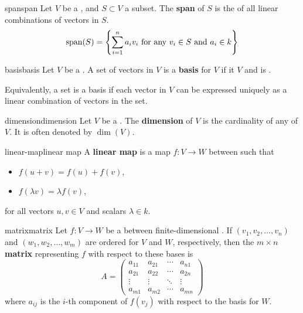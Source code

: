 \begin{topic}{span}{span}
    Let $V$ be a , and $S \subset V$ a subset. The \textbf{span} of $S$ is the  of all linear combinations of vectors in $S$.
    \[ \textup{span}(S) = \left\{ \sum_{i = 1}^{n} a_i v_i \textup{ for any } v_i \in S \textup{ and } a_i \in k \right\} \]
\end{topic}

\begin{topic}{basis}{basis}
    Let $V$ be a . A set of vectors in $V$ is a \textbf{basis} for $V$ if it  $V$ and is .
    
    Equivalently, a set is a basis if each vector in $V$ can be expressed uniquely as a linear combination of vectors in the set.
\end{topic}

\begin{topic}{dimension}{dimension}
    Let $V$ be a . The \textbf{dimension} of $V$ is the cardinality of any  of $V$. It is often denoted by $\dim(V)$.
\end{topic}

\begin{topic}{linear-map}{linear map}
    A \textbf{linear map} is a map $f \colon V \to W$ between  such that
    \begin{itemize}
        \item $f(u + v) = f(u) + f(v)$,
        \item $f(\lambda v) = \lambda f(v)$,
    \end{itemize}
    for all vectors $u, v \in V$ and scalars $\lambda \in k$.
\end{topic}

\begin{topic}{matrix}{matrix}
    Let $f \colon V \to W$ be a  between finite-dimensional . If $(v_1, v_2, \ldots, v_n)$ and $(w_1, w_2, \ldots, w_m)$ are ordered  for $V$ and $W$, respectively, then the $m \times n$ \textbf{matrix} representing $f$ with respect to these bases is
    \[ A = \begin{pmatrix} a_{11} & a_{21} & \cdots & a_{n1} \\ a_{21} & a_{22} & \cdots & a_{2n} \\ \vdots & \vdots & \ddots & \vdots \\ a_{m1} & a_{m2} & \cdots & a_{mn} \end{pmatrix} \]
    where $a_{ij}$ is the $i$-th component of $f(v_j)$ with respect to the basis for $W$.
\end{topic}

